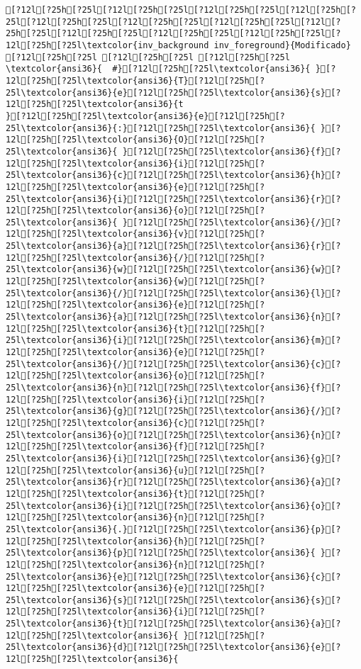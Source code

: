 \documentclass{scrartcl}
\begin{document}
\begin{Verbatim}
[?12l[?25h[?25l[?12l[?25h[?25l[?12l[?25h[?25l[?12l[?25h[?25l[?12l[?25h[?25l[?12l[?25h[?25l[?12l[?25h[?25l[?12l[?25h[?25l[?12l[?25h[?25l[?12l[?25h[?25l[?12l[?25h[?25l[?12l[?25h[?25l\textcolor{inv_background inv_foreground}{Modificado}
[?12l[?25h[?25l [?12l[?25h[?25l [?12l[?25h[?25l
\textcolor{ansi36}{  #}[?12l[?25h[?25l\textcolor{ansi36}{ }[?12l[?25h[?25l\textcolor{ansi36}{T}[?12l[?25h[?25l\textcolor{ansi36}{e}[?12l[?25h[?25l\textcolor{ansi36}{s}[?12l[?25h[?25l\textcolor{ansi36}{t
}[?12l[?25h[?25l\textcolor{ansi36}{e}[?12l[?25h[?25l\textcolor{ansi36}{:}[?12l[?25h[?25l\textcolor{ansi36}{ }[?12l[?25h[?25l\textcolor{ansi36}{O}[?12l[?25h[?25l\textcolor{ansi36}{ }[?12l[?25h[?25l\textcolor{ansi36}{f}[?12l[?25h[?25l\textcolor{ansi36}{i}[?12l[?25h[?25l\textcolor{ansi36}{c}[?12l[?25h[?25l\textcolor{ansi36}{h}[?12l[?25h[?25l\textcolor{ansi36}{e}[?12l[?25h[?25l\textcolor{ansi36}{i}[?12l[?25h[?25l\textcolor{ansi36}{r}[?12l[?25h[?25l\textcolor{ansi36}{o}[?12l[?25h[?25l\textcolor{ansi36}{ }[?12l[?25h[?25l\textcolor{ansi36}{/}[?12l[?25h[?25l\textcolor{ansi36}{v}[?12l[?25h[?25l\textcolor{ansi36}{a}[?12l[?25h[?25l\textcolor{ansi36}{r}[?12l[?25h[?25l\textcolor{ansi36}{/}[?12l[?25h[?25l\textcolor{ansi36}{w}[?12l[?25h[?25l\textcolor{ansi36}{w}[?12l[?25h[?25l\textcolor{ansi36}{w}[?12l[?25h[?25l\textcolor{ansi36}{/}[?12l[?25h[?25l\textcolor{ansi36}{l}[?12l[?25h[?25l\textcolor{ansi36}{e}[?12l[?25h[?25l\textcolor{ansi36}{a}[?12l[?25h[?25l\textcolor{ansi36}{n}[?12l[?25h[?25l\textcolor{ansi36}{t}[?12l[?25h[?25l\textcolor{ansi36}{i}[?12l[?25h[?25l\textcolor{ansi36}{m}[?12l[?25h[?25l\textcolor{ansi36}{e}[?12l[?25h[?25l\textcolor{ansi36}{/}[?12l[?25h[?25l\textcolor{ansi36}{c}[?12l[?25h[?25l\textcolor{ansi36}{o}[?12l[?25h[?25l\textcolor{ansi36}{n}[?12l[?25h[?25l\textcolor{ansi36}{f}[?12l[?25h[?25l\textcolor{ansi36}{i}[?12l[?25h[?25l\textcolor{ansi36}{g}[?12l[?25h[?25l\textcolor{ansi36}{/}[?12l[?25h[?25l\textcolor{ansi36}{c}[?12l[?25h[?25l\textcolor{ansi36}{o}[?12l[?25h[?25l\textcolor{ansi36}{n}[?12l[?25h[?25l\textcolor{ansi36}{f}[?12l[?25h[?25l\textcolor{ansi36}{i}[?12l[?25h[?25l\textcolor{ansi36}{g}[?12l[?25h[?25l\textcolor{ansi36}{u}[?12l[?25h[?25l\textcolor{ansi36}{r}[?12l[?25h[?25l\textcolor{ansi36}{a}[?12l[?25h[?25l\textcolor{ansi36}{t}[?12l[?25h[?25l\textcolor{ansi36}{i}[?12l[?25h[?25l\textcolor{ansi36}{o}[?12l[?25h[?25l\textcolor{ansi36}{n}[?12l[?25h[?25l\textcolor{ansi36}{.}[?12l[?25h[?25l\textcolor{ansi36}{p}[?12l[?25h[?25l\textcolor{ansi36}{h}[?12l[?25h[?25l\textcolor{ansi36}{p}[?12l[?25h[?25l\textcolor{ansi36}{ }[?12l[?25h[?25l\textcolor{ansi36}{n}[?12l[?25h[?25l\textcolor{ansi36}{e}[?12l[?25h[?25l\textcolor{ansi36}{c}[?12l[?25h[?25l\textcolor{ansi36}{e}[?12l[?25h[?25l\textcolor{ansi36}{s}[?12l[?25h[?25l\textcolor{ansi36}{s}[?12l[?25h[?25l\textcolor{ansi36}{i}[?12l[?25h[?25l\textcolor{ansi36}{t}[?12l[?25h[?25l\textcolor{ansi36}{a}[?12l[?25h[?25l\textcolor{ansi36}{ }[?12l[?25h[?25l\textcolor{ansi36}{d}[?12l[?25h[?25l\textcolor{ansi36}{e}[?12l[?25h[?25l\textcolor{ansi36}{ 
\end{Verbatim}
\end{document}
